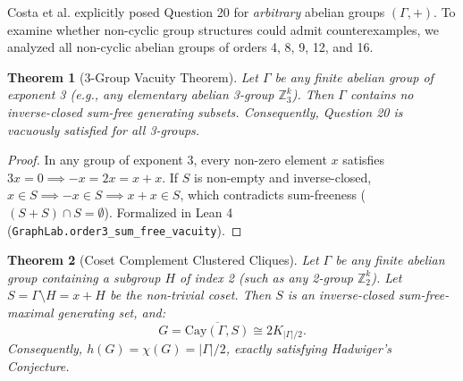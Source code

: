 \documentclass[11pt,a4paper]{article}
\newtheorem{theorem}{Theorem}
\theoremstyle{definition}
\begin{document}
Costa et al. explicitly posed Question 20 for \emph{arbitrary} abelian groups $(\Gamma, +)$. To examine whether non-cyclic group structures could admit counterexamples, we analyzed all non-cyclic abelian groups of orders 4, 8, 9, 12, and 16.

\begin{theorem}[3-Group Vacuity Theorem]
Let $\Gamma$ be any finite abelian group of exponent 3 (e.g., any elementary abelian 3-group $\mathbb{Z}_3^k$). Then $\Gamma$ contains no inverse-closed sum-free generating subsets. Consequently, Question 20 is vacuously satisfied for all 3-groups.
\end{theorem}
\begin{proof}
In any group of exponent 3, every non-zero element $x$ satisfies $3x = 0 \implies -x = 2x = x + x$. If $S$ is non-empty and inverse-closed, $x \in S \implies -x \in S \implies x + x \in S$, which contradicts sum-freeness ($(S+S)\cap S = \emptyset$). Formalized in Lean 4 (\texttt{GraphLab.order3\_sum\_free\_vacuity}).
\end{proof}

\begin{theorem}[Coset Complement Clustered Cliques]
Let $\Gamma$ be any finite abelian group containing a subgroup $H$ of index 2 (such as any 2-group $\mathbb{Z}_2^k$). Let $S = \Gamma \setminus H = x + H$ be the non-trivial coset. Then $S$ is an inverse-closed sum-free-maximal generating set, and:
\[
G = \overline{\text{Cay}(\Gamma, S)} \cong 2 K_{|\Gamma|/2}.
\]
Consequently, $h(G) = \chi(G) = |\Gamma|/2$, exactly satisfying Hadwiger's Conjecture.
\end{theorem}
\end{document}
